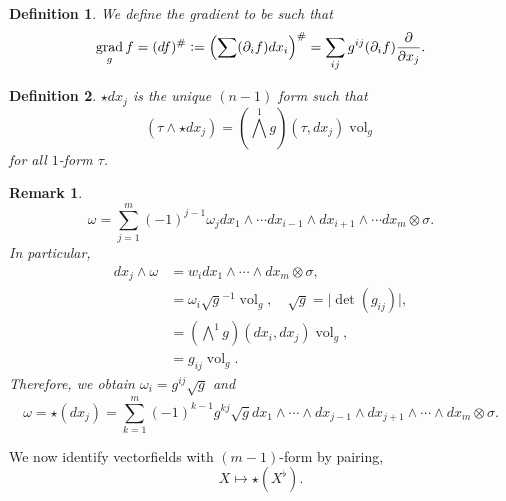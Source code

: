\documentclass[10pt]{article}
\newtheorem{definition}{Definition}[section]
\newtheorem{remark}{Remark}[section]
\DeclareMathOperator{\grad}{grad}
\DeclareMathOperator{\vol}{vol}
\newcommand{\defeq}{\vcentcolon=}
\newcommand{\pd}[2]{{\frac {\partial #1} {\partial #2}}}
\begin{document}

\begin{definition}
  We define the gradient to be such that 
  \begin{equation*}
    \grad_gf = (df)^\# \defeq \left(\sum (\partial_i f)dx_i\right)^\# = \sum_{ij}g^{ij}(\partial_i f)\pd{}{x_j}.
  \end{equation*}
\end{definition}

\begin{definition}
  $\star dx_j$ is the unique $(n-1)$ form such that 
  \begin{equation*}
    (\tau\wedge \star dx_j) = \left(\bigwedge^1 g\right)(\tau,dx_j)\vol_g
  \end{equation*}
  for all $1$-form $\tau$. 
\end{definition}

\begin{remark}
  \begin{equation*}
    \omega = \sum_{j=1}^m(-1)^{j-1}\omega_jdx_1\wedge\cdots dx_{i-1}\wedge dx_{i+1}\wedge\cdots dx_m\otimes\sigma.
  \end{equation*}
  In particular,
  \begin{align*}
    dx_j\wedge \omega & = w_idx_1\wedge \cdots \wedge dx_m\otimes \sigma,\\
    & = \omega_i\sqrt{g}^{-1}\vol_g,\quad \sqrt{g} = \vert \det (g_{ij})\vert,\\
    & = \left(\bigwedge^1 g\right)(dx_i,dx_j)\vol_g,\\
    & = g_{ij}\vol_g.
  \end{align*}
  Therefore, we obtain $\omega_i = g^{ij}\sqrt{g}$ and 
  \begin{equation*}
    \omega = \star(dx_j) = \sum_{k=1}^m (-1)^{k-1}g^{kj}\sqrt{g}dx_1\wedge\cdots\wedge dx_{j-1}\wedge dx_{j+1}\wedge\cdots \wedge dx_m\otimes\sigma.
  \end{equation*}
\end{remark}

We now identify vectorfields with $(m-1)$-form by pairing,
\begin{equation*}
  X\mapsto\star(X^\flat).
\end{equation*}
\end{document}
